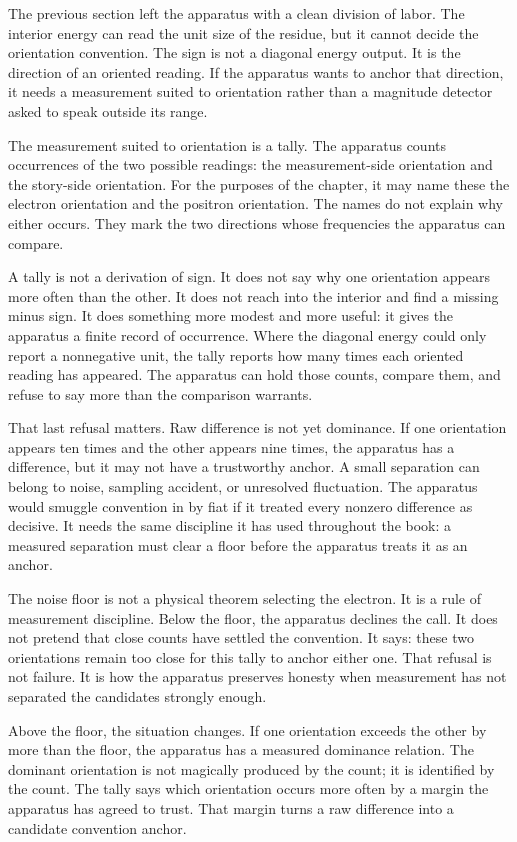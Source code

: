 The previous section left the apparatus with a clean division of labor. The
interior energy can read the unit size of the residue, but it cannot decide the
orientation convention. The sign is not a diagonal energy output. It is the
direction of an oriented reading. If the apparatus wants to anchor that
direction, it needs a measurement suited to orientation rather than a
magnitude detector asked to speak outside its range.

The measurement suited to orientation is a tally. The apparatus counts
occurrences of the two possible readings: the measurement-side orientation and
the story-side orientation. For the purposes of the chapter, it may name these
the electron orientation and the positron orientation. The names do not explain
why either occurs. They mark the two directions whose frequencies the apparatus
can compare.

A tally is not a derivation of sign. It does not say why one orientation
appears more often than the other. It does not reach into the interior and find
a missing minus sign. It does something more modest and more useful: it gives
the apparatus a finite record of occurrence. Where the diagonal energy could
only report a nonnegative unit, the tally reports how many times each oriented
reading has appeared. The apparatus can hold those counts, compare them, and
refuse to say more than the comparison warrants.

That last refusal matters. Raw difference is not yet dominance. If one
orientation appears ten times and the other appears nine times, the apparatus
has a difference, but it may not have a trustworthy anchor. A small separation
can belong to noise, sampling accident, or unresolved fluctuation. The
apparatus would smuggle convention in by fiat if it treated every nonzero
difference as decisive. It needs the same discipline it has used throughout the
book: a measured separation must clear a floor before the apparatus treats it
as an anchor.

The noise floor is not a physical theorem selecting the electron. It is a rule
of measurement discipline. Below the floor, the apparatus declines the call.
It does not pretend that close counts have settled the convention. It says:
these two orientations remain too close for this tally to anchor either one.
That refusal is not failure. It is how the apparatus preserves honesty when
measurement has not separated the candidates strongly enough.

Above the floor, the situation changes. If one orientation exceeds the other by
more than the floor, the apparatus has a measured dominance relation. The
dominant orientation is not magically produced by the count; it is identified
by the count. The tally says which orientation occurs more often by a margin
the apparatus has agreed to trust. That margin turns a raw difference into a
candidate convention anchor.

